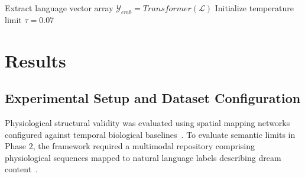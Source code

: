 \documentclass[journal]{IEEEtran}
\begin{document}
\begin{algorithm}[th]
\caption{Contrastive Phase 2 Semantic Mapping}
\label{alg:phase2}
Extract language vector array $\mathcal{Y}_{emb} = Transformer(\mathcal{L})$\;
Initialize temperature limit $\tau = 0.07$\;
\end{algorithm}

\section{Results}

\subsection{Experimental Setup and Dataset Configuration}
Physiological structural validity was evaluated using spatial mapping networks configured against temporal biological baselines~\cite{8852227, 10.3389/fnins.2023.1219133, yoon2019time}. To evaluate semantic limits in Phase 2, the framework required a multimodal repository comprising physiological sequences mapped to natural language labels describing dream content~\cite{siclari2018dreaming}.
\end{document}
